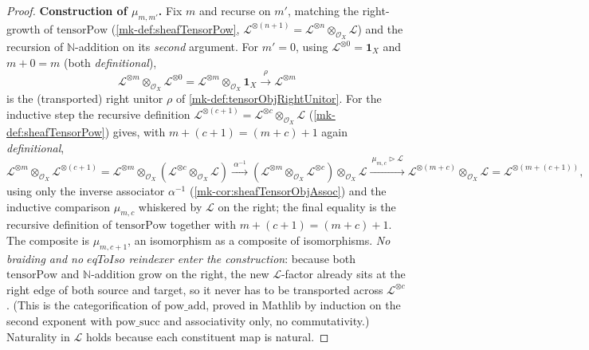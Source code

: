 \begin{proof}
  \textbf{Construction of \(\mu_{m,m'}\).} Fix \(m\) and recurse on \(m'\),
  matching the right-growth of \(\mathrm{tensorPow}\) (\ref{mk-def:sheafTensorPow},
  \(\mathcal{L}^{\otimes(n+1)} = \mathcal{L}^{\otimes n} \otimes_{\mathcal{O}_X}
  \mathcal{L}\)) and the recursion of \(\mathbb{N}\)-addition on its \emph{second}
  argument. For \(m' = 0\), using \(\mathcal{L}^{\otimes 0} = \mathbf{1}_X\) and
  \(m + 0 = m\) (both \emph{definitional}),
  \[
    \mathcal{L}^{\otimes m} \otimes_{\mathcal{O}_X} \mathcal{L}^{\otimes 0}
      = \mathcal{L}^{\otimes m} \otimes_{\mathcal{O}_X} \mathbf{1}_X
      \xrightarrow{\ \rho\ } \mathcal{L}^{\otimes m}
  \]
  is the (transported) right unitor \(\rho\) of \ref{mk-def:tensorObjRightUnitor}.
  For the inductive step the recursive definition \(\mathcal{L}^{\otimes (c+1)} =
  \mathcal{L}^{\otimes c} \otimes_{\mathcal{O}_X} \mathcal{L}\)
  (\ref{mk-def:sheafTensorPow}) gives, with \(m + (c+1) = (m+c)+1\) again
  \emph{definitional},
  \[
    \mathcal{L}^{\otimes m} \otimes_{\mathcal{O}_X} \mathcal{L}^{\otimes (c+1)}
    = \mathcal{L}^{\otimes m} \otimes_{\mathcal{O}_X}
      (\mathcal{L}^{\otimes c} \otimes_{\mathcal{O}_X} \mathcal{L})
    \xrightarrow{\ \alpha^{-1}\ }
    (\mathcal{L}^{\otimes m} \otimes_{\mathcal{O}_X} \mathcal{L}^{\otimes c})
      \otimes_{\mathcal{O}_X} \mathcal{L}
    \xrightarrow{\ \mu_{m,c} \rhd \mathcal{L}\ }
    \mathcal{L}^{\otimes (m+c)} \otimes_{\mathcal{O}_X} \mathcal{L}
    = \mathcal{L}^{\otimes (m + (c+1))},
  \]
  using only the inverse associator \(\alpha^{-1}\) (\ref{mk-cor:sheafTensorObjAssoc})
  and the inductive comparison \(\mu_{m,c}\) whiskered by \(\mathcal{L}\) on the
  right; the final equality is the recursive definition of \(\mathrm{tensorPow}\)
  together with \(m + (c+1) = (m+c)+1\). The composite is \(\mu_{m,c+1}\), an
  isomorphism as a composite of isomorphisms. \emph{No braiding and no \(eqToIso\)
  reindexer enter the construction}: because both \(\mathrm{tensorPow}\) and
  \(\mathbb{N}\)-addition grow on the right, the new \(\mathcal{L}\)-factor already
  sits at the right edge of both source and target, so it never has to be
  transported across \(\mathcal{L}^{\otimes c}\). (This is the categorification of
  \(\mathrm{pow\_add}\), proved in Mathlib by induction on the second exponent with
  \(\mathrm{pow\_succ}\) and associativity only, no commutativity.) Naturality in
  \(\mathcal{L}\) holds because each constituent map is natural.


\end{proof}
